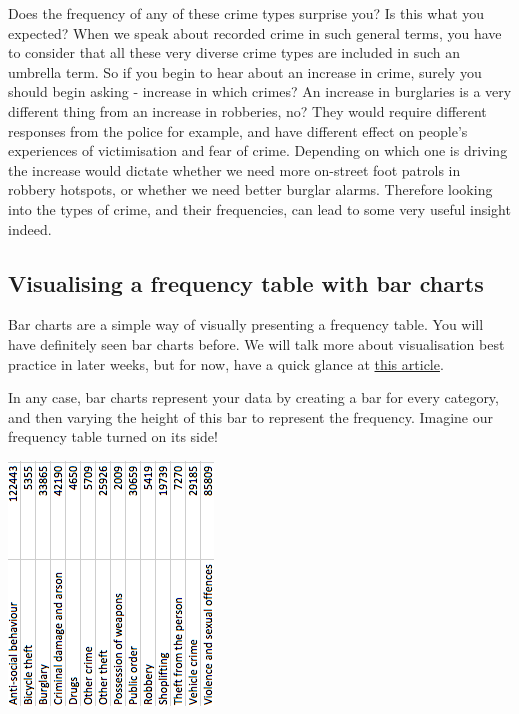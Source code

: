 \documentclass[]{book}
\theoremstyle{definition}
\theoremstyle{definition}
\theoremstyle{definition}
\theoremstyle{remark}
\begin{document}
Does the frequency of any of these crime types surprise you? Is this
what you expected? When we speak about recorded crime in such general
terms, you have to consider that all these very diverse crime types are
included in such an umbrella term. So if you begin to hear about an
increase in crime, surely you should begin asking - increase in which
crimes? An increase in burglaries is a very different thing from an
increase in robberies, no? They would require different responses from
the police for example, and have different effect on people's
experiences of victimisation and fear of crime. Depending on which one
is driving the increase would dictate whether we need more on-street
foot patrols in robbery hotspots, or whether we need better burglar
alarms. Therefore looking into the types of crime, and their
frequencies, can lead to some very useful insight indeed.

\hypertarget{visualising-a-frequency-table-with-bar-charts}{%
\subsection{Visualising a frequency table with bar
charts}\label{visualising-a-frequency-table-with-bar-charts}}

Bar charts are a simple way of visually presenting a frequency table.
You will have definitely seen bar charts before. We will talk more about
visualisation best practice in later weeks, but for now, have a quick
glance at
\href{https://flowingdata.com/2015/08/31/bar-chart-baselines-start-at-zero/}{this
article}.

In any case, bar charts represent your data by creating a bar for every
category, and then varying the height of this bar to represent the
frequency. Imagine our frequency table turned on its side!

\includegraphics{imgs/table_on_side.png}
\end{document}
